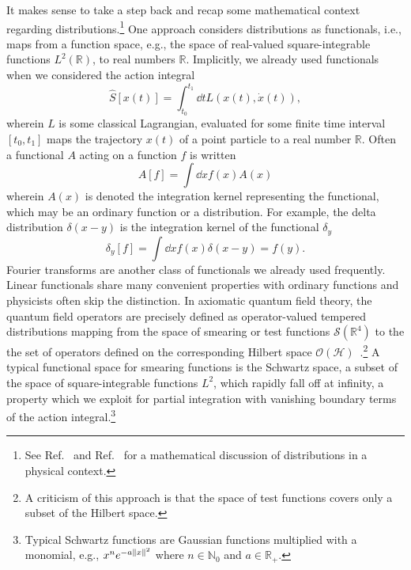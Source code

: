 It makes sense to take a step back and recap some mathematical context regarding distributions.\footnote{See Ref.~\cite[p.~590]{Zeidler2016} and Ref.~\cite[p.~193]{Mukhanov2007} for a mathematical discussion of distributions in a physical context.}
One approach considers distributions as functionals, i.e., maps from a function space, e.g., the space of real-valued square-integrable functions $L^2(\mathbb{R})$, to real numbers $\mathbb{R}$.
Implicitly, we already used functionals when we considered the action integral
\begin{equation}
	\hat{S}\left[x(t)\right]
	=
	\int_{t_0}^{t_1}\dd{t}
	L\left(x(t),\dot{x}(t)\right)
	,
\end{equation}
wherein $L$ is some classical Lagrangian, evaluated for some finite time interval $[t_0,t_1]$ maps the trajectory $x(t)$ of a point particle to a real number $\mathbb{R}$.
Often a functional $A$ acting on a function $f$ is written
\begin{equation}
	A[f]
	=
	\int\dd{x}
	f(x)A(x)
	\label{eq:functional}
\end{equation}
wherein $A(x)$ is denoted the integration kernel representing the functional, which may be an ordinary function or a distribution.
For example, the delta distribution $\delta(x-y)$ is the integration kernel of the functional $\delta_y$
\begin{equation}
	\delta_{y}[f]
	=
	\int\dd{x}
	f(x)
	\delta(x-y)
	=
	f(y)
	.
\end{equation}
Fourier transforms are another class of functionals we already used frequently.
Linear functionals share many convenient properties with ordinary functions and physicists often skip the distinction.
In axiomatic quantum field theory, the quantum field operators are precisely defined as operator-valued tempered distributions mapping from the space of smearing or test functions $\mathcal{S}(\mathbb{R}^4)$ to the the set of operators defined on the corresponding Hilbert space $\mathcal{O}(\mathcal{H})$~\cite[p.~56]{Haag2012}.\footnote{A criticism of this approach is that the space of test functions covers only a subset of the Hilbert space.}
A typical functional space for smearing functions is the Schwartz space, a subset of the space of square-integrable functions $L^2$, which rapidly fall off at infinity, a property which we exploit for partial integration with vanishing boundary terms of the action integral.\footnote{Typical Schwartz functions are Gaussian functions multiplied with a monomial, e.g., $x^ne^{-a\lVert x\rVert^2}$ where $n\in\mathbb{N}_0$ and $a\in\mathbb{R}_+$.}

